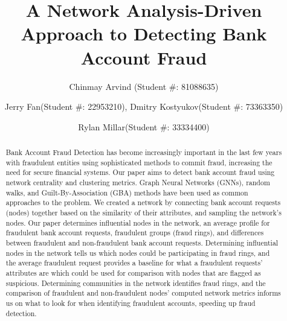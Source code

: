 \documentclass{styles/svproc}
\begin{document}
\mainmatter              %
%
\title{A Network Analysis-Driven Approach to Detecting Bank Account Fraud}
%
%
\author{Chinmay Arvind (Student \#: 81088635) \and Jerry Fan(Student \#: 22953210),
Dmitry Kostyukov(Student \#: 73363350) \and Rylan Millar(Student \#: 33334400)}
%
%
%
\maketitle              %
\begin{abstract}
Bank Account Fraud Detection has become increasingly important in the last few years with fraudulent entities using sophisticated methods to commit fraud, increasing the need for secure financial systems. Our paper aims to detect bank account fraud using network centrality and clustering metrics. Graph Neural Networks (GNNs), random walks, and Guilt-By-Association (GBA) methods have been used as common approaches to the problem. We created a network by connecting bank account requests (nodes) together based on the similarity of their attributes, and sampling the network's nodes. Our paper determines influential nodes in the network, an average profile for fraudulent bank account requests, fraudulent groups (fraud rings), and differences between fraudulent and non-fraudulent bank account requests. Determining influential nodes in the network tells us which nodes could be participating in fraud rings, and the average fraudulent request provides a baseline for what a fraudulent requests' attributes are which could be used for comparison with nodes that are flagged as suspicious. Determining communities in the network identifies fraud rings, and the comparison of fraudulent and non-fraudulent nodes' computed network metrics informs us on what to look for when identifying fraudulent accounts, speeding up fraud detection.
\end{abstract}
\end{document}
